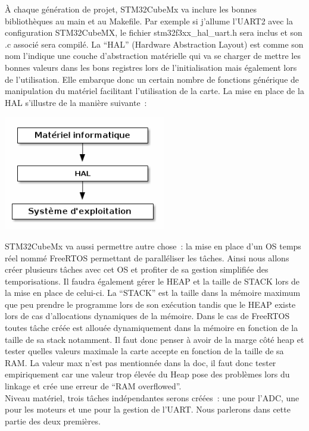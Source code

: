 \documentclass{article}
\begin{document}
À chaque génération de projet, STM32CubeMx va inclure les bonnes bibliothèques au main et au Makefile. Par exemple si j'allume l'UART2 avec la configuration STM32CubeMX, le fichier stm32f3xx\_hal\_uart.h sera inclus et son .c associé sera compilé. La ``HAL'' (Hardware Abstraction Layout) est comme son nom l'indique une couche d'abstraction matérielle qui va se charger de mettre les bonnes valeurs dans les bons registres lors de l'initialisation mais également lors de l'utilisation. Elle embarque donc un certain nombre de fonctions générique de manipulation du matériel facilitant l'utilisation de la carte. La mise en place de la HAL s'illustre de la manière suivante~:\\

\begin{center}
  \includegraphics[height=5cm]{diag_HAL.png}
\end{center}

STM32CubeMx va aussi permettre autre chose~: la mise en place d'un OS temps réel nommé FreeRTOS permettant de paralléliser les tâches. Ainsi nous allons créer plusieurs tâches avec cet OS et profiter de sa gestion simplifiée des temporisations. Il faudra également gérer le HEAP et la taille de STACK lors de la mise en place de celui-ci. La ``STACK'' est la taille dans la mémoire maximum que peu prendre le programme lors de son exécution tandis que le HEAP existe lors de cas d'allocations dynamiques de la mémoire. Dans le cas de FreeRTOS toutes tâche créée est allouée dynamiquement dans la mémoire en fonction de la taille de sa stack notamment. Il faut donc penser à avoir de la marge côté heap et tester quelles valeurs maximale la carte accepte en fonction de la taille de sa RAM. La valeur max n'est pas mentionnée dans la doc, il faut donc tester empiriquement car une valeur trop élevée du Heap pose des problèmes lors du linkage et crée une erreur de ``RAM overflowed''. \\

Niveau matériel, trois tâches indépendantes serons créées~: une pour l'ADC, une pour les moteurs et une pour la gestion de l'UART. Nous parlerons dans cette partie des deux premières.
\end{document}
